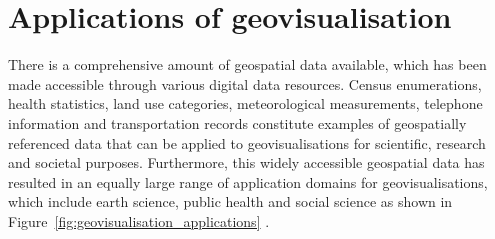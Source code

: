 \section{Applications of geovisualisation} {


	There is a comprehensive amount of geospatial data available, which has been made accessible through various digital data resources. Census enumerations, health statistics, land use categories, meteorological measurements, telephone information and transportation records constitute examples of geospatially referenced data that can be applied to geovisualisations for scientific, research and societal purposes. Furthermore, this widely accessible geospatial data has resulted in an equally large range of application domains for geovisualisations, which include earth science, public health and social science as shown in Figure~\ref{fig:geovisualisation_applications} \parencite{maceachren2004geovisualization}.

}
